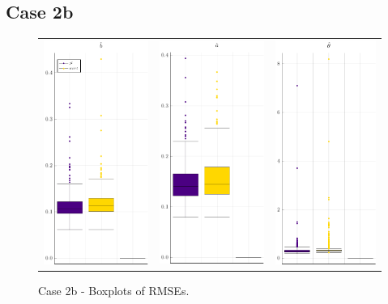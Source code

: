 \subsection{Case 2b}
\begin{figure}[H] 
	
	\centering
	\begin{tabular}[b]{c c c}
		\includegraphics[width=.3\textwidth]{Figures/2b/RMSE_b.pdf} & \includegraphics[width=.3\textwidth]{Figures/2b/RMSE_a.pdf} & \includegraphics[width=.3\textwidth]{Figures/2b/RMSE_t.pdf}
	\end{tabular}
	\caption{Case 2b - Boxplots of RMSEs.}
	\label{fig:bpRMSE2b}
\end{figure}
